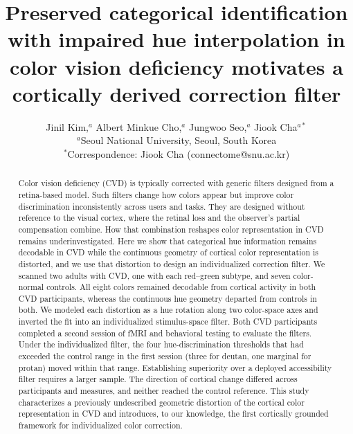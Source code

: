 \documentclass{imag-ms-template}
\title{Preserved categorical identification with impaired hue interpolation in color vision deficiency motivates a cortically derived correction filter}
\author{%
Jinil Kim,$^{a}$ Albert Minkue Cho,$^{a}$ Jungwoo Seo,$^{a}$ Jiook Cha$^{a\ast}$\\
{\small $^{a}$Seoul National University, Seoul, South Korea}\\
{\small $^{\ast}$Correspondence: Jiook Cha (connectome@snu.ac.kr)}
}
\begin{document}
\linenumbers

\maketitle


\begin{abstract}
Color vision deficiency (CVD) is typically corrected with generic filters designed from a retina-based model. Such filters change how colors appear but improve color discrimination inconsistently across users and tasks. They are designed without reference to the visual cortex, where the retinal loss and the observer's partial compensation combine. How that combination reshapes color representation in CVD remains underinvestigated. Here we show that categorical hue information remains decodable in CVD while the continuous geometry of cortical color representation is distorted, and we use that distortion to design an individualized correction filter. We scanned two adults with CVD, one with each red--green subtype, and seven color-normal controls. All eight colors remained decodable from cortical activity in both CVD participants, whereas the continuous hue geometry departed from controls in both. We modeled each distortion as a hue rotation along two color-space axes and inverted the fit into an individualized stimulus-space filter. Both CVD participants completed a second session of fMRI and behavioral testing to evaluate the filters. Under the individualized filter, the four hue-discrimination thresholds that had exceeded the control range in the first session (three for deutan, one marginal for protan) moved within that range. Establishing superiority over a deployed accessibility filter requires a larger sample. The direction of cortical change differed across participants and measures, and neither reached the control reference. This study characterizes a previously undescribed geometric distortion of the cortical color representation in CVD and introduces, to our knowledge, the first cortically grounded framework for individualized color correction.
\end{abstract}






\end{document}

